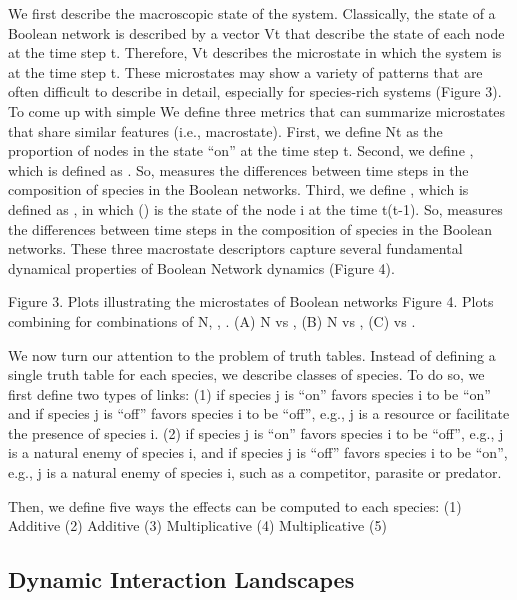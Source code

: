 \documentclass[10pt]{article}
\begin{document}
We first describe the macroscopic state of the system. Classically, the state of a Boolean network is described by a vector Vt that describe the state of each node at the time step t. Therefore, Vt describes the microstate in which the system is at the time step t. These microstates may show a variety of patterns that are often difficult to describe in detail, especially for species-rich systems (Figure 3). To come up with simple  
We define three metrics that can summarize microstates that share similar features (i.e., macrostate). First, we define Nt as the proportion of nodes in the state “on” at the time step t. Second, we define , which is defined as . So,  measures the differences between time steps in the composition of species in the Boolean networks. Third, we define , which is defined as , in which () is the state of the node i at the time t(t-1). So,  measures the differences between time steps in the composition of species in the Boolean networks. These three macrostate descriptors capture several fundamental dynamical properties of Boolean Network dynamics (Figure 4).

Figure 3. Plots illustrating the microstates of Boolean networks
Figure 4. Plots combining for combinations of N, , . (A) N vs , (B) N vs , (C)  vs .

	We now turn our attention to the problem of truth tables. Instead of defining a single truth table for each species, we describe classes of species. To do so, we first define two types of links: 
    (1) if species j is “on” favors species i to be “on” and if species j is “off” favors species i to be “off”, e.g., j is a resource or facilitate the presence of species i.
    (2) if species j is “on” favors species i to be “off”, e.g., j is a natural enemy of species i, and if species j is “off” favors species i to be “on”, e.g., j is a natural enemy of species i, such as a competitor, parasite or predator. 

Then, we define five ways the effects can be computed to each species:
    (1) Additive 
    (2) Additive 
    (3) Multiplicative 
    (4) Multiplicative 
    (5) 

    \subsection{Dynamic Interaction Landscapes}
\end{document}
